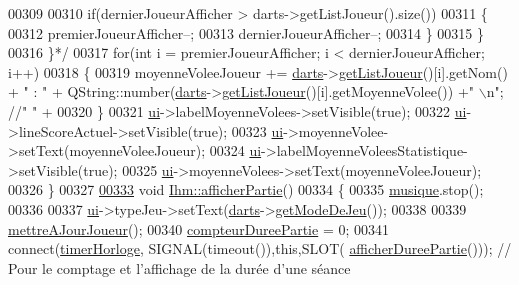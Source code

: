 \begin{DoxyCode}
00309 \textcolor{comment}{}
00310 \textcolor{comment}{            if(dernierJoueurAfficher > darts->getListJoueur().size())}
00311 \textcolor{comment}{            \{}
00312 \textcolor{comment}{                premierJoueurAfficher--;}
00313 \textcolor{comment}{                dernierJoueurAfficher--;}
00314 \textcolor{comment}{            \}}
00315 \textcolor{comment}{        \}}
00316 \textcolor{comment}{    \}*/}
00317     \textcolor{keywordflow}{for}(\textcolor{keywordtype}{int} i = premierJoueurAfficher; i < dernierJoueurAfficher; i++)
00318     \{
00319         moyenneVoleeJoueur += \hyperlink{class_ihm_a2a0f54d33f4d6b2531ec2190c4a2356e}{darts}->\hyperlink{class_darts_a0525b09703d3461bf5570197354743c3}{getListJoueur}()[i].getNom() + \textcolor{stringliteral}{" : "} + 
      QString::number(\hyperlink{class_ihm_a2a0f54d33f4d6b2531ec2190c4a2356e}{darts}->\hyperlink{class_darts_a0525b09703d3461bf5570197354743c3}{getListJoueur}()[i].getMoyenneVolee()) +\textcolor{stringliteral}{" \(\backslash\)n"}; \textcolor{comment}{//"         " +}
00320     \}
00321     \hyperlink{class_ihm_a0ac5f47856566ceeeca1720109bf70ea}{ui}->labelMoyenneVolees->setVisible(\textcolor{keyword}{true});
00322     \hyperlink{class_ihm_a0ac5f47856566ceeeca1720109bf70ea}{ui}->lineScoreActuel->setVisible(\textcolor{keyword}{true});
00323     \hyperlink{class_ihm_a0ac5f47856566ceeeca1720109bf70ea}{ui}->moyenneVolee->setText(moyenneVoleeJoueur);
00324     \hyperlink{class_ihm_a0ac5f47856566ceeeca1720109bf70ea}{ui}->labelMoyenneVoleesStatistique->setVisible(\textcolor{keyword}{true});
00325     \hyperlink{class_ihm_a0ac5f47856566ceeeca1720109bf70ea}{ui}->moyenneVolees->setText(moyenneVoleeJoueur);
00326 \}
00327 
\hyperlink{class_ihm_a3b26fb5299eba99925d005ea39eef9da}{00333} \textcolor{keywordtype}{void} \hyperlink{class_ihm_a3b26fb5299eba99925d005ea39eef9da}{Ihm::afficherPartie}()
00334 \{
00335     \hyperlink{class_ihm_a6e2a173ec36ee846d6210117b4b85fa8}{musique}.stop();
00336 
00337     \hyperlink{class_ihm_a0ac5f47856566ceeeca1720109bf70ea}{ui}->typeJeu->setText(\hyperlink{class_ihm_a2a0f54d33f4d6b2531ec2190c4a2356e}{darts}->\hyperlink{class_darts_a49ea4ca23fd03d80f5a95257c6fe8478}{getModeDeJeu}());
00338 
00339     \hyperlink{class_ihm_aaeeb08a39f940e58da194768763dc00b}{mettreAJourJoueur}();
00340     \hyperlink{class_ihm_a61e4a83f8ca0f177971af808e51be5bb}{compteurDureePartie} = 0;
00341     connect(\hyperlink{class_ihm_a21ea35b212966fa2805241ea6237d351}{timerHorloge}, SIGNAL(timeout()),\textcolor{keyword}{this},SLOT(
      \hyperlink{class_ihm_a808bd550b877499a38419a492595822e}{afficherDureePartie}())); \textcolor{comment}{// Pour le comptage et l'affichage de la durée d'une séance}

\end{DoxyCode}
